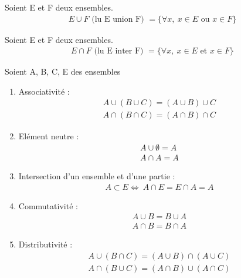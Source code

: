 \begin{definitionbox}
    \begin{definition}
	Soient E et F deux ensembles.
	\begin{align*}
		E \cup F \text{ (lu E union F) } = \{\forall x,\ x \in E \text{ ou } x \in F \}
	\end{align*}
\end{definition}
\end{definitionbox}

\begin{definitionbox}
    \begin{definition}
	Soient E et F deux ensembles.
	\begin{align*}
		E \cap F \text{ (lu E inter F) } = \{\forall x,\ x \in E \text{ et } x \in F \}
	\end{align*}
\end{definition}
\end{definitionbox}

\begin{propositionbox}
    \begin{proposition} Soient A, B, C, E des ensembles
	\begin{enumerate}
		\item Associativité :
		\begin{align*}
			A \cup (B \cup C) = (A \cup B) \cup C \\
			A \cap (B \cap C) = (A \cap B) \cap C
		\end{align*}
		\item Elément neutre : 
		\begin{align*}
			A \cup \emptyset = A \\
            A \cap A = A
		\end{align*}
		\item Intersection d'un ensemble et d'une partie :
		\begin{align*}
			A \subset E \iff \ A \cap E = E \cap A = A
		\end{align*}
		\item Commutativité :
		\begin{align*}
			A \cup B = B \cup A \\
			A \cap B = B \cap A
		\end{align*}
		\item Distributivité :
		\begin{align*}
			A \cup (B \cap C) = (A \cup B) \cap (A \cup C) \\
			A \cap (B \cup C) = (A \cap B) \cup (A \cap C)
		\end{align*}
	\end{enumerate}
\end{proposition}
\end{propositionbox}

